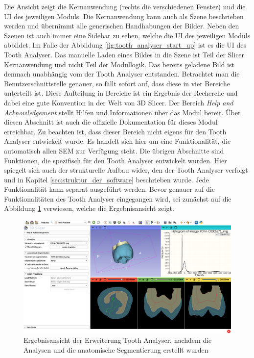 Die Ansicht zeigt die Kernanwendung (rechts die verschiedenen Fenster) und die \ac{UI}
des jeweiligen Moduls. Die Kernanwendung kann auch als Szene beschrieben werden und
übernimmt alle generischen Handhabungen der Bilder. Neben den Szenen ist auch
immer eine Sidebar zu sehen, welche die \ac{UI} des jeweiligen Moduls abbildet. Im
Falle der Abbildung \ref{fig:tooth_analyser_start_up} ist es die \ac{UI} des
Tooth Analyser. Das manuelle Laden eines Bildes in die Szene ist Teil der Slicer
Kernanwendung und nicht Teil der Modullogik. Das bereits geladene Bild ist
demnach unabhängig vom der Tooth Analyser entstanden. Betrachtet man die Benutzerschnittstelle
genauer, so fällt sofort auf, dass diese in vier Bereiche unterteilt ist. Diese
Aufteilung in Bereiche ist ein Ergebnis der Recherche und dabei eine gute
Konvention in der Welt von 3D Slicer. Der Bereich \textit{Help and
Acknowledgement} stellt Hilfen und Informationen über das Modul bereit. Über diesen
Abschnitt ist auch die offizielle Dokumentation für dieses Modul erreichbar. Zu
beachten ist, dass dieser Bereich nicht eigens für den Tooth Analyser entwickelt
wurde. Es handelt sich hier um eine Funktionalität, die automatisch allen \ac{SEM}
zur Verfügung steht. Die übrigen Abschnitte sind Funktionen, die spezifisch für
den Tooth Analyser entwickelt wurden. Hier spiegelt sich auch der strukturelle Aufbau
wider, den der Tooth Analyser verfolgt und in Kapitel
\ref{sec:struktur_der_software} beschrieben wurde. Jede Funktionalität kann separat
ausgeführt werden. Bevor genauer auf die Funktionalitäten des Tooth Analyser
eingegangen wird, sei zunächst auf die Abbildung \ref{fig:tooth_analyser_full_view}
verwiesen, welche die Ergebnisansicht zeigt.

\begin{figure}[h]
	\centering
	\includegraphics[width=\textwidth]{img/toothAnalyserFullView.png}
	\caption{Ergebnisansicht der Erweiterung Tooth Analyser, nachdem die Analysen und
	die anatomische Segmentierung erstellt wurden}
	\label{fig:tooth_analyser_full_view}
\end{figure}

